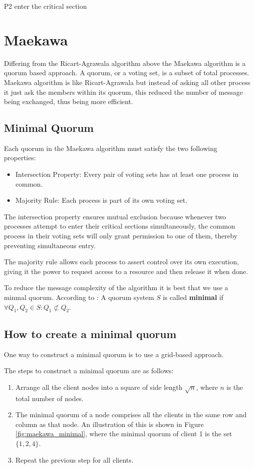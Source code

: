 P2 enter the critical section

\section{Maekawa}
Differing from the Ricart-Agrawala algorithm above the Maekawa algorithm is a quorum based 
approach. A quorum, or a voting set, is a subset of total processes. Maekawa algorithm
is like Ricart-Agrawala but instead of asking all other process it just ask the members within
its quorum, this reduced the number of message being exchanged, thus being more efficient.

\subsection{Minimal Quorum}
Each quorum in the Maekawa algorithm must satisfy the two following properties:

\begin{itemize}
 \item Intersection Property: Every pair of voting sets has at least one process in common. 
 \item Majority Rule: Each process is part of its own voting set.
\end{itemize}
The intersection property ensures mutual exclusion because whenever two processes 
attempt to enter their critical sections simultaneously, the common process in their voting sets will only grant permission to one of them, thereby preventing simultaneous entry.

The majority rule allows each process to assert control over its own execution, giving it the power to request access to a resource and then release it when done.

To reduce the message complexity of the algorithm it is best that we use a minmal 
quorum. According to \cite{eth_quorum}: A quorum system $S$ is called \textbf{minimal}
if $\forall Q_1, Q_2 \in S: Q_1 \not\subset Q_2$.



\subsection{How to create a minimal quorum}

One way to construct a minimal quorum is to use a grid-based approach.

The steps to construct a minimal quorum are as follows:

\begin{enumerate}
\item Arrange all the client nodes into a square of side length $\sqrt{n}$, where $n$ is the total number of nodes.
\item The minimal quorum of a node comprises all the clients in the same row 
  and column as that node. An illustration of this is shown in Figure 
  \ref{fig:maekawa_minimal}, where the minimal quorum of client 1 is the set $\{1,2,4\}$.
\item Repeat the previous step for all clients.
\end{enumerate}


